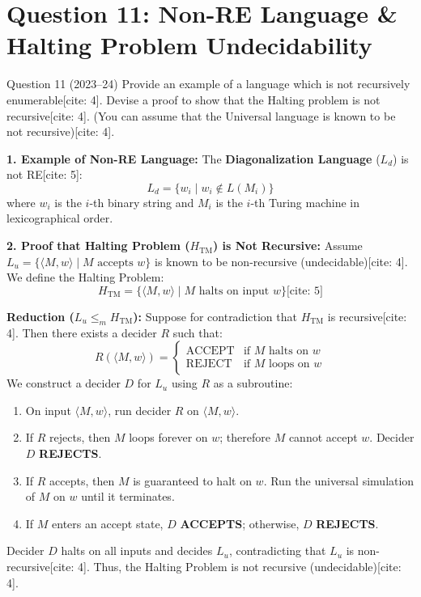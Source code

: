 \documentclass[11pt,a4paper]{article}
\begin{document}
\section{Question 11: Non-RE Language \& Halting Problem Undecidability}
\begin{questionbox}{Question 11 (2023--24)}
Provide an example of a language which is not recursively enumerable[cite: 4]. Devise a proof to show that the Halting problem is not recursive[cite: 4]. (You can assume that the Universal language is known to be not recursive)[cite: 4].
\end{questionbox}

\begin{solutionbox}
\textbf{1. Example of Non-RE Language:}
The \textbf{Diagonalization Language} ($L_d$) is not RE[cite: 5]:
$$L_d = \{w_i \mid w_i \notin L(M_i)\}$$
where $w_i$ is the $i$-th binary string and $M_i$ is the $i$-th Turing machine in lexicographical order.

\textbf{2. Proof that Halting Problem ($H_{\text{TM}}$) is Not Recursive:}
Assume $L_u = \{\langle M, w \rangle \mid M \text{ accepts } w\}$ is known to be non-recursive (undecidable)[cite: 4].
We define the Halting Problem:
$$H_{\text{TM}} = \{\langle M, w \rangle \mid M \text{ halts on input } w\} \text{[cite: 5]}$$

\textbf{Reduction ($L_u \le_m H_{\text{TM}}$):}
Suppose for contradiction that $H_{\text{TM}}$ is recursive[cite: 4]. Then there exists a decider $R$ such that:
$$R(\langle M, w \rangle) = \begin{cases} \text{ACCEPT} & \text{if } M \text{ halts on } w \\ \text{REJECT} & \text{if } M \text{ loops on } w \end{cases}$$
We construct a decider $D$ for $L_u$ using $R$ as a subroutine:
\begin{enumerate}[leftmargin=*]
    \item On input $\langle M, w \rangle$, run decider $R$ on $\langle M, w \rangle$.
    \item If $R$ rejects, then $M$ loops forever on $w$; therefore $M$ cannot accept $w$. Decider $D$ \textbf{REJECTS}.
    \item If $R$ accepts, then $M$ is guaranteed to halt on $w$. Run the universal simulation of $M$ on $w$ until it terminates.
    \item If $M$ enters an accept state, $D$ \textbf{ACCEPTS}; otherwise, $D$ \textbf{REJECTS}.
\end{enumerate}
Decider $D$ halts on all inputs and decides $L_u$, contradicting that $L_u$ is non-recursive[cite: 4]. Thus, the Halting Problem is not recursive (undecidable)[cite: 4].
\end{solutionbox}
\end{document}
